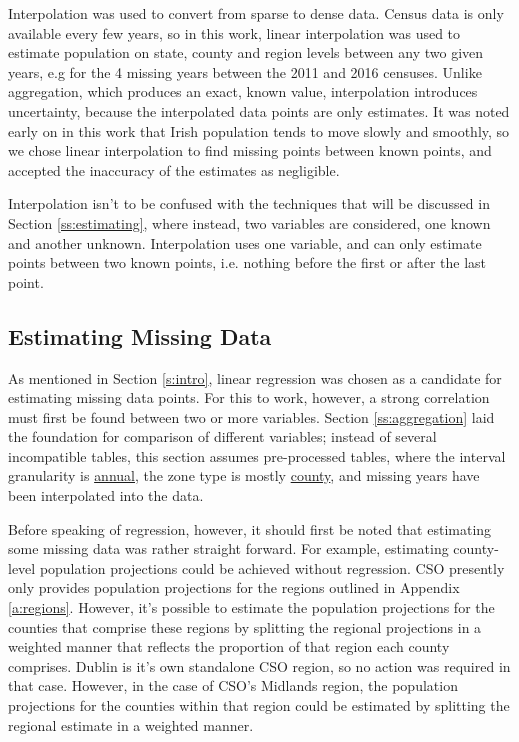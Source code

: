 \documentclass[twocolumn]{article}
\begin{document}
Interpolation was used to convert from sparse to dense data.  Census data
is only available every few years, so in this work, linear interpolation was
used to estimate population on state, county and region levels between any two
given years, e.g for the 4 missing years between the 2011 and 2016 censuses.
Unlike aggregation, which produces an
exact, known value, interpolation introduces uncertainty, because the
interpolated data points are only estimates.  It was noted early on in this
work that Irish population tends to move slowly and smoothly, so we chose
linear interpolation to find missing points between known points, and accepted
the inaccuracy of the estimates as negligible.

Interpolation isn't to be confused with the techniques that will be discussed in
Section \ref{ss:estimating}, where instead, two variables are considered, one known
and another unknown.  Interpolation uses one variable, and can only estimate points between
two known points, i.e. nothing before the first or after the last point.

\subsection{Estimating Missing Data\label{ss:estimating}}
As mentioned in Section \ref{s:intro}, linear regression was chosen as a candidate for
estimating missing data points.  For this to work, however, a strong correlation must first
be found between two or more variables.  Section \ref{ss:aggregation} laid the foundation
for comparison of different variables; instead of several incompatible tables, this section assumes
pre-processed tables, where the interval granularity is \underline{annual}, the zone type is
mostly \underline{county}, and missing years have been interpolated into the data.

Before speaking of regression, however, it should first be noted that
estimating some missing data was rather straight forward.  For
example, estimating county-level population projections could be achieved
without regression.  CSO presently only provides population projections for the
regions outlined in Appendix \ref{a:regions}.  However, it's possible to
estimate the population projections for the counties that comprise these
regions by splitting the regional projections in a weighted manner that reflects the
proportion of that region each county comprises.  Dublin is it's own standalone CSO region,
so no action was required in that case.  However, in the case of CSO's Midlands region,
the population projections for the counties within that region could be
estimated by splitting the regional estimate in a weighted manner.
\end{document}
